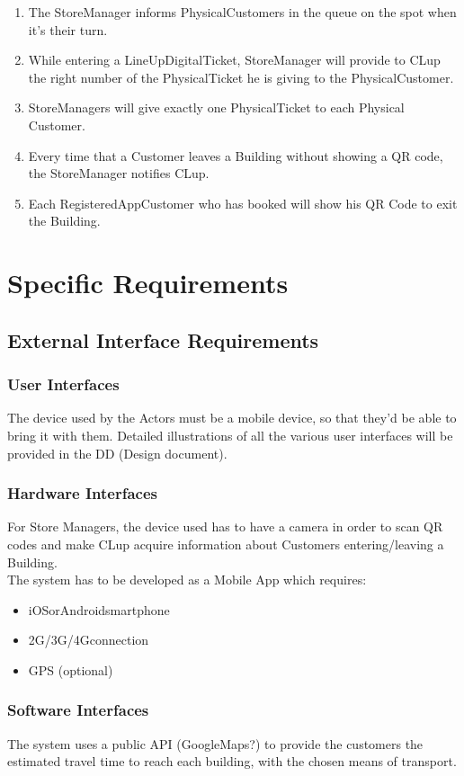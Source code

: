 \documentclass{article}
\begin{document}
\begin{enumerate}
		\item The StoreManager informs PhysicalCustomers in the queue on the spot when it's their turn.
		\item While entering a LineUpDigitalTicket, StoreManager will provide to CLup the right number of the PhysicalTicket he is giving 		to the PhysicalCustomer.
		\item StoreManagers will give exactly one PhysicalTicket to each Physical Customer.
		\item Every time that a Customer leaves a Building without showing a QR code, the StoreManager notifies CLup.
		\item Each RegisteredAppCustomer who has booked will show his QR Code to exit the Building.
	\end{enumerate}
	
	\section {Specific Requirements}
	\subsection {External Interface Requirements}
	\subsubsection {User Interfaces}
	The device used by the Actors must be a mobile device, so that they’d be able to bring it with them. Detailed illustrations of all the various user interfaces will be provided in the DD (Design document).
	\subsubsection {Hardware Interfaces}
	For Store Managers, the device used has to have a camera in order to scan QR codes and make CLup acquire information about Customers entering/leaving a Building. \\
The system has to be developed as a Mobile App which requires:
	\renewcommand\labelitemi{\textbullet}
	\begin{itemize}
		\item iOSorAndroidsmartphone 
		\item 2G/3G/4Gconnection
		\item GPS (optional)
	\end{itemize}
	\subsubsection {Software Interfaces}
	The system uses a public API (GoogleMaps?) to provide the customers the estimated travel time to reach each building, with the chosen means of transport.
\end{document}
